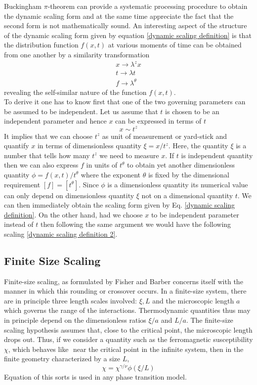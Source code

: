 	Buckingham $\pi$-theorem can provide a systematic processing procedure to obtain the dynamic scaling form and at the same time appreciate the fact that the second form is not mathematically sound. An interesting aspect of the structure of the dynamic scaling form given by equation \ref{dynamic scaling definition} is that the distribution function $f(x,t)$ at various moments of time can be obtained from one another by a similarity transformation
	\begin{align}
		x \rightarrow \lambda^z x \\
		t \rightarrow \lambda t \\
		f \rightarrow \lambda^\theta
	\end{align}
	revealing the self-similar nature of the function $f(x,t)$.\\
	
	To derive it one has to know first that one of the two governing parameters can be assumed to be independent. Let us assume that $t$ is	chosen to be an independent parameter and hence $x$ can be expressed	in terms of $t$
	\begin{equation}
	x \sim t^z
	\end{equation}
	It implies that we can choose $t^z$ as unit of measurement or yard-stick and quantify $x$ in terms of dimensionless quantity $\xi=x/t^z$. Here, the	quantity $\xi$ is a number that tells how many $t^z$ we need to measure $x$.	If $t$ is independent quantity then we can also express $f$ in units of $t^\theta$	to obtain yet another dimensionless quantity $\phi = f (x, t)/t^\theta$ where the	exponent $\theta$ is fixed by the dimensional requirement $\left[f\right] = \left[t^\theta\right]$. Since $\phi$ is a dimensionless quantity its numerical value can only depend on dimensionless quantity $\xi$ not on a dimensional quantity $t$. We	can then immediately obtain the scaling form given by Eq. \ref{dynamic scaling definition}. On	the other hand, had we choose $x$ to be independent parameter instead of	$t$ then following the same argument we would have the following scaling \ref{dynamic scaling definition 2}.
	
	
	\subsection{Finite Size Scaling}
	\label{subsect:FSS}
	Finite-size scaling, as formulated by Fisher and Barber \cite{Fisher1972}	concerns itself with the manner in which this rounding or crossover occurs. In a finite-size	system, there are in principle three length scales involved: $\xi, L$ and the microscopic length $a$	which governs the range of the interactions. Thermodynamic quantities thus may in principle	depend on the dimensionless ratios $\xi/a$ and $L/a$. The finite-size scaling hypothesis assumes	that, close to the critical point, the microscopic length drops out. Thus, if we consider a	quantity such as the ferromagnetic susceptibility $\chi$, which behaves like $ $ near the critical	point in the infinite system, then in the finite geometry characterized by a size $L$,
	\begin{equation}
		\chi = \chi^{\gamma/\nu} \phi(\xi/L)
	\end{equation}
	Equation of this sorts is used in any phase transition model.
	
